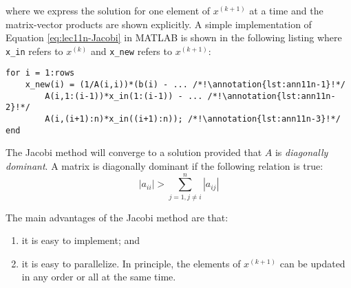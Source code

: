 where we express the solution for one element of $x^{(k+1)}$ at a time and the matrix-vector products are shown explicitly. A simple implementation of Equation \ref{eq:lec11n-Jacobi} in MATLAB is shown in the following listing where \lstinline[style=myMatlab]{x_in} refers to $x^{(k)}$ and \lstinline[style=myMatlab]{x_new} refers to $x^{(k+1)}$:
\begin{lstlisting}[style=myMatlab]
for i = 1:rows
    x_new(i) = (1/A(i,i))*(b(i) - ... /*!\annotation{lst:ann11n-1}!*/
        A(i,1:(i-1))*x_in(1:(i-1)) - ... /*!\annotation{lst:ann11n-2}!*/
        A(i,(i+1):n)*x_in((i+1):n)); /*!\annotation{lst:ann11n-3}!*/
end
\end{lstlisting}

The Jacobi method will converge to a solution provided that $A$ is \emph{diagonally dominant}.  A matrix is diagonally dominant if the following relation is true:
\begin{equation*}
|a_{ii}| > \sum\limits_{j=1, j\ne i}^{n} |a_{ij}|
\end{equation*}

The main advantages of the Jacobi method are that:
\begin{enumerate}
\item it is easy to implement; and
\item it is easy to parallelize. In principle, the elements of $x^{(k+1)}$ can be updated in any order or all at the same time.
\end{enumerate}

